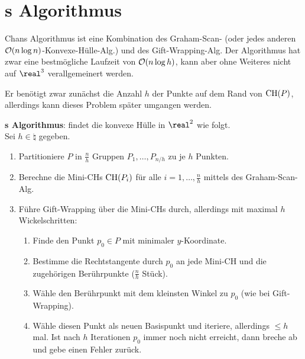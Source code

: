 \pagebreak

\section{%
    s Algorithmus%
}

Chans Algorithmus ist eine Kombination des Graham-Scan-
(oder jedes anderen $\mathcal{O}(n \log n)$-Konvexe-Hülle-Alg.)
und des Gift-Wrapping-Alg.
Der Algorithmus hat zwar eine bestmögliche Laufzeit von $\mathcal{O}(n \log h)$,
kann aber ohne Weiteres nicht auf $\real^3$ verallgemeinert werden.

Er benötigt zwar zunächst die Anzahl $h$ der Punkte auf dem Rand von $\operatorname{CH}(P)$,
allerdings kann dieses Problem später umgangen werden.

\textbf{s Algorithmus}:
 findet die konvexe Hülle in $\real^2$ wie folgt.\\
Sei $h \in \natural$ gegeben.
\begin{enumerate}
    \item
    Partitioniere $P$ in $\frac{n}{h}$ Gruppen $P_1, \dotsc, P_{n/h}$ zu je $h$ Punkten.

    \item
    Berechne die Mini-CHs $\operatorname{CH}(P_i)$ für alle $i = 1, \dotsc, \frac{n}{h}$ mittels des
    Graham-Scan-Alg.

    \item
    Führe Gift-Wrapping über die Mini-CHs durch, allerdings mit maximal $h$ Wickelschritten:
    \begin{enumerate}[label=\emph{(\roman*)}]
        \item
        Finde den Punkt $p_0 \in P$ mit minimaler $y$-Koordinate.

        \item
        Bestimme die Rechtstangente durch $p_0$ an jede Mini-CH und die zugehörigen
        Berührpunkte ($\frac{n}{h}$ Stück).

        \item
        Wähle den Berührpunkt mit dem kleinsten Winkel zu $p_0$ (wie bei Gift-Wrapping).

        \item
        Wähle diesen Punkt als neuen Basispunkt und iteriere,
        allerdings $\le h$ mal.
        Ist nach $h$ Iterationen $p_0$ immer noch nicht erreicht, dann breche ab und
        gebe einen Fehler zurück.
    \end{enumerate}
\end{enumerate}


